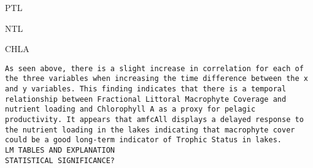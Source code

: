 \documentclass[
]{book}
\begin{document}
PTL

NTL

CHLA

\begin{verbatim}
As seen above, there is a slight increase in correlation for each of the three variables when increasing the time difference between the x and y variables. This finding indicates that there is a temporal relationship between Fractional Littoral Macrophyte Coverage and nutrient loading and Chlorophyll A as a proxy for pelagic productivity. It appears that amfcAll displays a delayed response to the nutrient loading in the lakes indicating that macrophyte cover could be a good long-term indicator of Trophic Status in lakes. 
LM TABLES AND EXPLANATION
STATISTICAL SIGNIFICANCE?
\end{verbatim}
\end{document}
